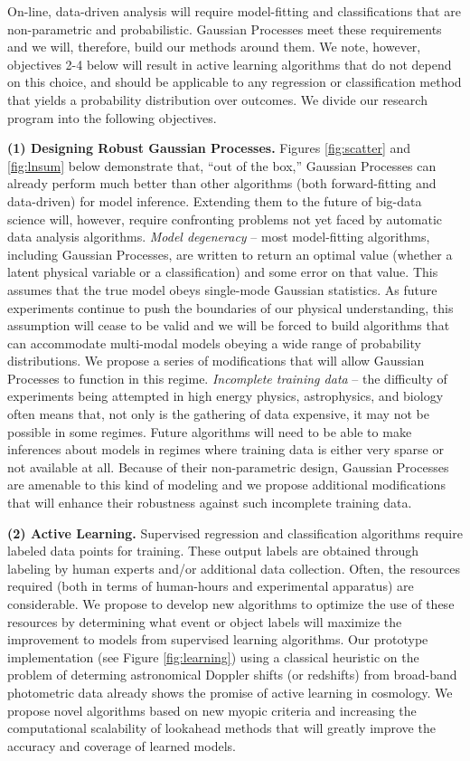 \documentclass[prd,nofootbib,floatfix,11pt,tightenlines]{revtex4}
\begin{document}
On-line, data-driven analysis will require model-fitting and
classifications that are non-parametric and probabilistic.  Gaussian
Processes meet these requirements and we will, therefore, build our methods
around them.  We note, however, objectives 2-4 below will result in 
active learning algorithms that do
not depend on this choice, and should be applicable to any
regression or classification method that yields a probability distribution
over outcomes.  We divide our
research program into the following objectives.

{\bf (1) Designing Robust Gaussian Processes.}  Figures \ref{fig:scatter}
and \ref{fig:lnsum} below demonstrate that, ``out of the box,'' Gaussian
Processes can already perform much better than other algorithms (both
forward-fitting and data-driven) for model inference. Extending them
to the future of big-data science will, however, require confronting problems not yet
faced by automatic data analysis algorithms. {\it Model degeneracy} -- most model-fitting algorithms, including Gaussian
Processes, are written to return an optimal value (whether a latent physical
variable or a classification) and some error on that value.  This assumes that
the true model obeys single-mode Gaussian statistics.  As future experiments
continue to push the boundaries of our physical understanding, this assumption
will cease to be valid and we will be forced to build algorithms that can
accommodate multi-modal models obeying a wide range of probability
distributions.  We propose a series of modifications that will allow Gaussian
Processes to function in this regime.
{\it Incomplete training data} -- the difficulty of experiments being attempted
in high energy physics, astrophysics, and biology often means that, not only is
the gathering of data expensive, it may not be possible in some regimes.  Future
algorithms will need to be able to make inferences about models in regimes where
training data is either very sparse or not available at all.  Because of their
non-parametric design, Gaussian Processes are amenable to this kind of
modeling and we propose additional modifications that will enhance their
robustness against such incomplete training data.

{\bf (2) Active Learning.} Supervised regression and classification algorithms
require labeled data points for training.  These output labels are obtained
through labeling by human experts and/or additional data collection.
Often, the resources required (both in terms of human-hours and
experimental apparatus) are considerable.  We propose to develop new
algorithms to optimize the use of these resources by determining what event
or object labels will maximize the improvement to models from supervised
learning algorithms.  Our prototype implementation (see Figure \ref{fig:learning}) 
using a classical
heuristic on the problem of determing astronomical Doppler shifts (or
redshifts) from broad-band photometric data already shows the promise of
active learning in cosmology.  We propose novel algorithms based on new
myopic criteria and increasing the computational scalability of lookahead
methods that will greatly improve the accuracy and coverage of learned
models.
\end{document}
